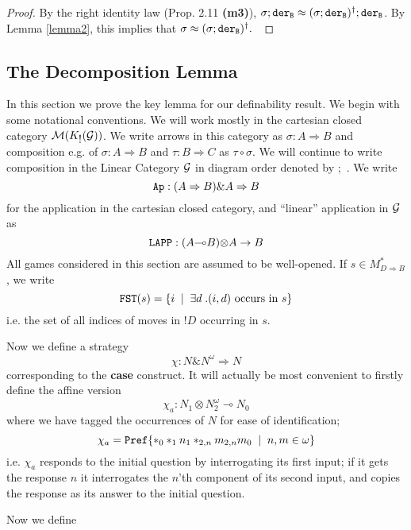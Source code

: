 \documentclass[11pt]{article}
\newcommand{\M}{{\cal M}}
\newcommand{\ofcourse}{\mbox{$!$}}
\newcommand{\with}{\mbox{$\&$}}
\newcommand{\tensor}{\mbox{$\otimes$}}
\newcommand{\linimpl}{\mbox{$\multimap$}}
\newcommand{\KG}{K_{\ofcourse }({\cal G})}
\begin{document}
\begin{proof} By the right identity law (Prop. 2.11 \textbf{(m3)}),
 $\sigma;\tt{der}_B\approx (\sigma;\tt{der}_B)^{\dag};\tt{der}_B$.
By Lemma \ref{lemma2}, this implies that
$\sigma\approx(\sigma;\tt{der}_B)^{\dag}. \;\;$
\end{proof}


\subsection{The Decomposition Lemma}

In this section we prove the key lemma for our definability
result. We begin with some notational conventions. We will work
mostly in the cartesian closed category  $\M(\KG)$. We write
arrows in this category as $\sigma : A\Rightarrow B$ and
composition e.g. of $\sigma: A\Rightarrow B$ and $\tau :
B\Rightarrow C$ as $\tau\circ\sigma$. We will continue to write
composition in the Linear Category $\cal G$ in diagram order
denoted by $;$ . We write $${\tt Ap} : (A\Rightarrow B)\with
A\Rightarrow B$$ for the application in the cartesian closed
category, and ``linear'' application in $\cal G$ as $${\tt LAPP }
: (A\linimpl B)\tensor A\rightarrow B$$ All games considered in
this section are assumed to be well-opened. If $s\in
M^*_{D\Rightarrow B}$, we write $${\tt FST}(s)=\{ i\;\mid \;
\exists d\;.(i,d)\mbox{ occurs in } s\}$$ i.e. the set of all
indices of moves in $!D$ occurring in $s$.

Now we define a strategy
$$\chi : N\with N^{\omega} \Rightarrow N$$
corresponding to the {\bf case} construct. It will actually be most
convenient to firstly define the affine version
$$\chi_a : N_1\tensor N_2^{\omega}\linimpl N_0$$
where we have tagged the occurrences of $N$ for ease of
identification;
$$\chi_a={\tt Pref}\{*_0*_1 n_1 *_{2,n} m_{2,n} m_0 \;\mid \;
n,m\in\omega\}$$
i.e. $\chi_a$ responds to the initial question by interrogating its
first input; if it gets the response $n$ it interrogates the $n$'th
component of its second input, and copies the response as its answer
to the initial question.

Now we define
\end{document}
